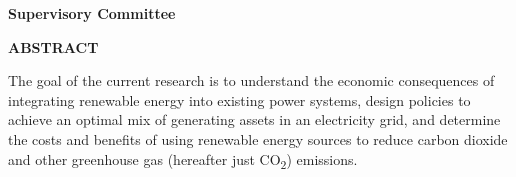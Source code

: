 \newpage
{}

\noindent \textbf{Supervisory Committee}
\tpbreak
\panel

\begin{center}
\textbf{ABSTRACT}
\end{center}


The goal of the current research is to understand the economic
consequences of integrating renewable energy into existing power
systems, design policies to achieve an optimal mix of generating assets
in an electricity grid, and determine the costs and benefits of using
renewable energy sources to reduce carbon dioxide and other greenhouse
gas (hereafter just CO\textsubscript{2}) emissions.